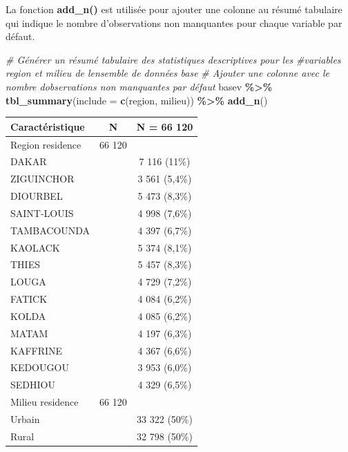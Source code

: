 \documentclass[
]{article}
\newenvironment{Shaded}{\begin{snugshade}}{\end{snugshade}}
\newcommand{\AttributeTok}[1]{\textcolor[rgb]{0.13,0.29,0.53}{#1}}
\newcommand{\CommentTok}[1]{\textcolor[rgb]{0.56,0.35,0.01}{\textit{#1}}}
\newcommand{\FunctionTok}[1]{\textcolor[rgb]{0.13,0.29,0.53}{\textbf{#1}}}
\newcommand{\NormalTok}[1]{#1}
\newcommand{\SpecialCharTok}[1]{\textcolor[rgb]{0.81,0.36,0.00}{\textbf{#1}}}
\begin{document}
La fonction \textbf{add\_n()} est utilisée pour ajouter une colonne au
résumé tabulaire qui indique le nombre d'observations non manquantes
pour chaque variable par défaut.

\begin{Shaded}
\begin{Highlighting}[]
\CommentTok{\# Générer un résumé tabulaire des statistiques descriptives pour les }
\CommentTok{\#variables \textquotesingle{}region\textquotesingle{} et \textquotesingle{}milieu\textquotesingle{} de l\textquotesingle{}ensemble de données \textquotesingle{}base\textquotesingle{}}
\CommentTok{\# Ajouter une colonne avec le nombre d\textquotesingle{}observations non manquantes par défaut}
\NormalTok{basev }\SpecialCharTok{\%\textgreater{}\%}
  \FunctionTok{tbl\_summary}\NormalTok{(}\AttributeTok{include =} \FunctionTok{c}\NormalTok{(region, milieu)) }\SpecialCharTok{\%\textgreater{}\%}
  \FunctionTok{add\_n}\NormalTok{()  }
\end{Highlighting}
\end{Shaded}

\begin{longtable}[]{@{}lcc@{}}
\toprule\noalign{}
\textbf{Caractéristique} & \textbf{N} & \textbf{N = 66 120} \\
\midrule\noalign{}
\endhead
\bottomrule\noalign{}
\endlastfoot
Region residence & 66 120 & \\
DAKAR & & 7 116 (11\%) \\
ZIGUINCHOR & & 3 561 (5,4\%) \\
DIOURBEL & & 5 473 (8,3\%) \\
SAINT-LOUIS & & 4 998 (7,6\%) \\
TAMBACOUNDA & & 4 397 (6,7\%) \\
KAOLACK & & 5 374 (8,1\%) \\
THIES & & 5 457 (8,3\%) \\
LOUGA & & 4 729 (7,2\%) \\
FATICK & & 4 084 (6,2\%) \\
KOLDA & & 4 085 (6,2\%) \\
MATAM & & 4 197 (6,3\%) \\
KAFFRINE & & 4 367 (6,6\%) \\
KEDOUGOU & & 3 953 (6,0\%) \\
SEDHIOU & & 4 329 (6,5\%) \\
Milieu residence & 66 120 & \\
Urbain & & 33 322 (50\%) \\
Rural & & 32 798 (50\%) \\
\end{longtable}
\end{document}
